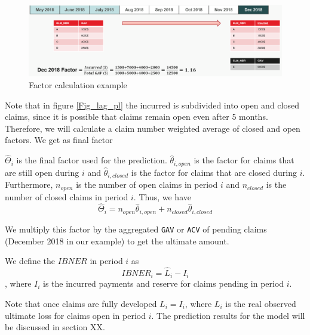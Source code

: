 	\begin{figure}[H]
		\begin{center}
			\includegraphics[scale=0.4]{Graphiques/factor_example} 
			\renewcommand{\figurename}{Figure}
			\caption{Factor calculation example}\label{Fig_factor_example}
		\end{center}
	\end{figure}
	Note that in figure \ref{Fig_lag_pl} the incurred is subdivided into open and closed claims, since it is possible that claims remain open even after 5 months. Therefore, we will calculate a claim number weighted average of closed and open factors. We get as final factor
	\begin{Definition}\label{Def_final_factor}
		$\hat{\Theta}_i$ is the final factor used for the prediction. $\hat{\theta}_{i,open}$ is the factor for claims that are still open during $i$ and  $\hat{\theta}_{i,closed}$ is the factor for claims that are closed during $i$. Furthermore, $n_{open}$ is the number of open claims in period $i$ and $n_{closed}$ is the number of closed claims in period $i$. Thus, we have
		$$\hat{\Theta}_i = n_{open} \hat{\theta}_{i,open} + n_{closed} \hat{\theta}_{i,closed}$$ 
	\end{Definition}
	
	We multiply this factor by the aggregated \texttt{GAV} or \texttt{ACV} of pending claims (December 2018 in our example) to get the ultimate amount.
	
	\begin{Definition}
		We define the $IBNER$ in period $i$ as
		$$IBNER_i = \hat{L}_i - I_i$$
		, where $I_i$ is the incurred payments and reserve for claims pending in period $i$.
	\end{Definition}
	Note that once claims are fully developed $L_i = I_i$, where $L_i$ is the real observed ultimate loss for claims open in period $i$. 
	The prediction results for the model will be discussed in section XX.
	
